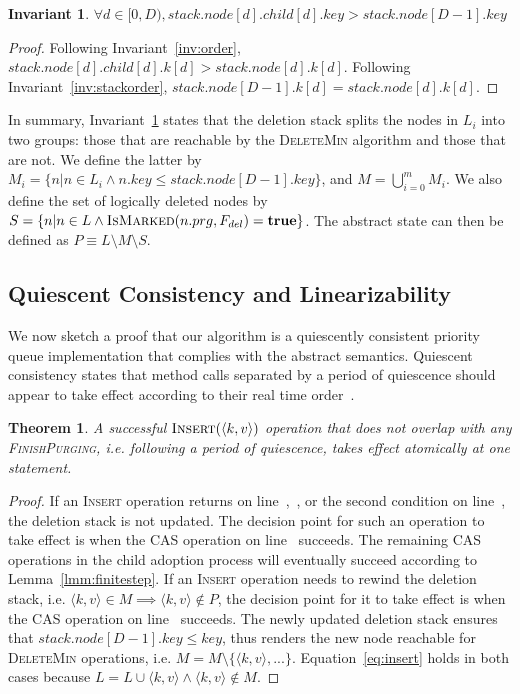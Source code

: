 \documentclass[10pt,journal,letterpaper,compsoc]{IEEEtran}
\newtheorem{theorem}{Theorem}
\newtheorem{invariant}{Invariant}
\newcommand\TRUE{\text{\textbf{true}}}
\begin{document}
\begin{invariant}\label{inv:stacksplit}
    $\forall d \in [0,D), stack.node[d].child[d].key > stack.node[D-1].key$
\end{invariant}
\begin{proof}
    Following Invariant~\ref{inv:order}, $stack.node[d].child[d].k[d] > stack.node[d].k[d]$.
    Following Invariant~\ref{inv:stackorder}, $stack.node[D-1].k[d] = stack.node[d].k[d]$.
\end{proof}

In summary, Invariant~\ref{inv:stacksplit} states that the deletion stack splits the nodes in $L_i$ into two groups: those that are reachable by the \textsc{DeleteMin} algorithm and those that are not.
We define the latter by $M_i=\{n|n\in L_i \land n.key \leq stack.node[D-1].key\}$, and $M=\bigcup_{i=0}^{m}M_i$.
We also define the set of logically deleted nodes by $S=\{n|n\in L \land \textsc{IsMarked}(n.prg, F_{del}) = \TRUE\}$.
The abstract state can then be defined as $P \equiv L \setminus M \setminus S$.

\subsection{Quiescent Consistency and Linearizability}
We now sketch a proof that our algorithm is a quiescently consistent priority queue implementation that complies with the abstract semantics. Quiescent consistency states that method calls separated by a period of quiescence should appear to take effect according to their real time order~\cite{herlihy2012art}.

\begin{theorem}
    A successful $\textsc{Insert}(\langle k,v\rangle)$ operation that does not overlap with any \textsc{FinishPurging}, i.e. following a period of quiescence, takes effect atomically at one statement.
\end{theorem}
\begin{proof}
    If an \textsc{Insert} operation returns on line~,~, or the second condition on line~, the deletion stack is not updated.
    The decision point for such an operation to take effect is when the CAS operation on line~ succeeds.
    The remaining CAS operations in the child adoption process will eventually succeed according to Lemma~\ref{lmm:finitestep}.
    If an \textsc{Insert} operation needs to rewind the deletion stack, i.e. $\langle k,v \rangle \in M \implies \langle k,v \rangle \notin P$, the decision point for it to take effect is when the CAS operation on line~ succeeds.
    The newly updated deletion stack ensures that $stack.node[D-1].key \le key$, thus renders the new node reachable for \textsc{DeleteMin} operations, i.e. $M = M \setminus \{\langle k,v \rangle,...\}$.
    Equation~\ref{eq:insert} holds in both cases because $L=L\cup \langle k,v \rangle \land \langle k,v \rangle \notin M$.
\end{proof}
\end{document}
